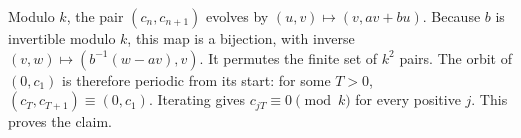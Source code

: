 Modulo $k$, the pair $(c_n,c_{n+1})$ evolves by $(u,v)\mapsto(v,av+bu)$. Because $b$ is invertible modulo $k$, this map is a bijection, with inverse $(v,w)\mapsto(b^{-1}(w-av),v)$. It permutes the finite set of $k^2$ pairs. The orbit of $(0,c_1)$ is therefore periodic from its start: for some $T>0$, $(c_T,c_{T+1})\equiv(0,c_1)$. Iterating gives $c_{jT}\equiv0\pmod k$ for every positive $j$. This proves the claim.
